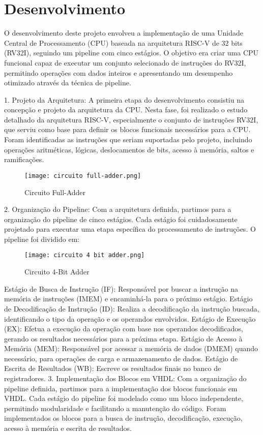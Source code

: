 \documentclass[12pt]{article}
\begin{document}
\section{Desenvolvimento}
O desenvolvimento deste projeto envolveu a implementação de uma Unidade Central de Processamento (CPU) baseada na arquitetura RISC-V de 32 bits (RV32I), seguindo um pipeline com cinco estágios. O objetivo era criar uma CPU funcional capaz de executar um conjunto selecionado de instruções do RV32I, permitindo operações com dados inteiros e apresentando um desempenho otimizado através da técnica de pipeline.

1. Projeto da Arquitetura:
A primeira etapa do desenvolvimento consistiu na concepção e projeto da arquitetura da CPU. Nesta fase, foi realizado o estudo detalhado da arquitetura RISC-V, especialmente o conjunto de instruções RV32I, que serviu como base para definir os blocos funcionais necessários para a CPU. Foram identificadas as instruções que seriam suportadas pelo projeto, incluindo operações aritméticas, lógicas, deslocamentos de bits, acesso à memória, saltos e ramificações.

\begin{figure}[h]
    \centering
    \texttt{[image: circuito full-adder.png]}
    \caption{Circuito Full-Adder}
\end{figure}

2. Organização do Pipeline:
Com a arquitetura definida, partimos para a organização do pipeline de cinco estágios. Cada estágio foi cuidadosamente projetado para executar uma etapa específica do processamento de instruções. O pipeline foi dividido em:

\begin{figure}[h]
    \centering
    \texttt{[image: circuito 4 bit adder.png]}
    \caption{Circuito 4-Bit Adder}
\end{figure}

Estágio de Busca de Instrução (IF): Responsável por buscar a instrução na memória de instruções (IMEM) e encaminhá-la para o próximo estágio.
Estágio de Decodificação de Instrução (ID): Realiza a decodificação da instrução buscada, identificando o tipo da operação e os operandos envolvidos.
Estágio de Execução (EX): Efetua a execução da operação com base nos operandos decodificados, gerando os resultados necessários para a próxima etapa.
Estágio de Acesso à Memória (MEM): Responsável por acessar a memória de dados (DMEM) quando necessário, para operações de carga e armazenamento de dados.
Estágio de Escrita de Resultados (WB): Escreve os resultados finais no banco de registradores.
3. Implementação dos Blocos em VHDL:
Com a organização do pipeline definida, partimos para a implementação dos blocos funcionais em VHDL. Cada estágio do pipeline foi modelado como um bloco independente, permitindo modularidade e facilitando a manutenção do código. Foram implementados os blocos para a busca de instrução, decodificação, execução, acesso à memória e escrita de resultados.
\end{document}
